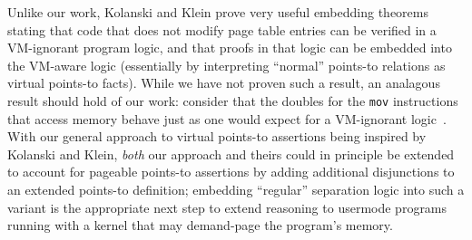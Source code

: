 Unlike our work, Kolanski and Klein prove very useful embedding theorems stating that code that does not modify page table 
entries can be verified in a VM-ignorant program logic, and that proofs in that logic can be embedded into the VM-aware logic 
(essentially by interpreting ``normal'' points-to relations as virtual points-to facts). While we have not proven such a result,
an analagous result {should} hold of our work: consider that the doubles for the \texttt{mov} instructions
that access memory behave just as one would expect for a VM-ignorant logic~\cite{Chlipala2013Bedrock}.
With our general approach to virtual points-to assertions being inspired by Kolanski and Klein, \emph{both}
 our approach and theirs could in principle be extended to account for pageable points-to assertions by adding additional 
disjunctions to an extended points-to definition; embedding ``regular'' separation logic into such a variant
is the appropriate next step to extend reasoning to usermode programs running with a kernel that may demand-page the program's
memory.

